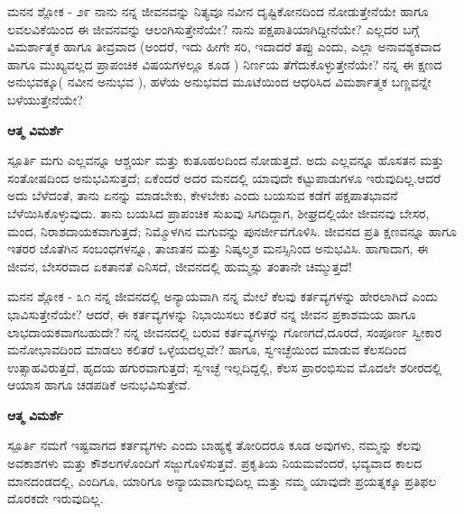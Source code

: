 \begin{mananam}{\mananamfont ಮನನ ಶ್ಲೋಕ - ೨೯}
\footnotesize \mananamtext ನಾನು ನನ್ನ ಜೀವನವನ್ನು ನಿತ್ಯವೂ ನವೀನ ದೃಷ್ಟಿಕೋನದಿಂದ ನೋಡುತ್ತೇನೆಯೇ ಹಾಗೂ ಲವಲವಿಕೆಯಿಂದ ಈ ಜೀವನವನ್ನು ಆಲಂಗಿಸುತ್ತೇನೆಯೇ? ನಾನು ಪಕ್ಷಪಾತಿಯಾಗಿದ್ದೀನೆಯೇ? ಎಲ್ಲದರ ಬಗ್ಗೆ ವಿಮರ್ಶಾತ್ಮಕ ಹಾಗೂ ತೀವ್ರವಾದ (ಅಂದರೆ, ಇದು ಹೀಗೇ ಸರಿ, ಇದಾದರೆ ತಪ್ಪು ಎಂದು, ಎಲ್ಲಾ ಅನಾವಶ್ಯಕವಾದ ಹಾಗೂ ಮುಖ್ಯವಲ್ಲದ ಪ್ರಾಪಂಚಿಕ ವಿಷಯಗಳಲ್ಲೂ ಕೂಡ ) ನಿರ್ಣಯ ತೆಗೆದುಕೊಳ್ಳುತ್ತೇನೆಯೇ? ನನ್ನ ಈ ಕ್ಷಣದ ಅನುಭವಕ್ಕೂ( ನವೀನ ಅನುಭವ ), ಹಳೆಯ  ಅನುಭವದ ಮೂಟೆಯಿಂದ ಆಧರಿಸಿದ ವಿಮರ್ಶಾತ್ಮಕ ಬಣ್ಣವನ್ನೇ ಬಳೆಯುತ್ತೇನೆಯೇ?
\end{mananam}
\WritingHand\enspace\textbf{ಆತ್ಮ ವಿಮರ್ಶೆ}
\begin{inspiration}{\mananamfont ಸ್ಪೂರ್ತಿ}
\footnotesize \mananamtext ಮಗು ಎಲ್ಲವನ್ನೂ ಆಶ್ಚರ್ಯ ಮತ್ತು ಕುತೂಹಲದಿಂದ ನೋಡುತ್ತದೆ. ಅದು ಎಲ್ಲವನ್ನೂ ಹೊಸತನ ಮತ್ತು ಸಂತೋಷದಿಂದ ಅನುಭವಿಸುತ್ತದೆ; ಏಕೆಂದರೆ ಅದರ ಮನದಲ್ಲಿ ಯಾವುದೇ ಕಟ್ಟುಪಾಡುಗಳೂ ಇರುವುದಿಲ್ಲ.ಆದರೆ ಅದು ಬೆಳೆದಂತೆ, ತಾನು ಏನನ್ನು ಮಾಡಬೇಕು, ಕೇಳಬೇಕು ಎಂದು ಬಯಸುವ ಕಡೆಗೆ ಪಕ್ಷಪಾತಭಾವನೆ ಬೆಳೆಯಿಸಿಕೊಳ್ಳುವುದು. ತಾನು ಬಯಸಿದ ಪ್ರಾಪಂಚಿಕ ಸುಖವು ಸಿಗದಿದ್ದಾಗ,  ಶೀಘ್ರದಲ್ಲಿಯೇ ಜೀವನವು ಬೇಸರ, ಮಂದ, ನಿರಾಶದಾಯಕವಾಗುತ್ತದೆ; ನಿಮ್ಮೊಳಗಿನ ಮಗುವನ್ನು ಪುನರ್ಜೀವಗೊಳಿಸಿ. ಜೀವನದ ಪ್ರತಿ ಕ್ಷಣವನ್ನೂ ಹಾಗೂ ಇತರರ ಜೊತೆಗಿನ ಸಂಬಂಧಗಳನ್ನೂ, ತಾಜಾತನ ಮತ್ತು ನಿಷ್ಕಲ್ಮಶ ಮನಸ್ಸಿನಿಂದ ಅನುಭವಿಸಿ. ಹಾಗಾದಾಗ, ಈ ಜೀವನ, ಬೇಸರವಾದ ಏಕತಾನತೆ ಎನಿಸದೆ, ಜೀವನದಲ್ಲಿ ಹುಮ್ಮಸ್ಸು ತಂತಾನೇ ಚಿಮ್ಮುತ್ತದೆ!
\end{inspiration}
\newpage

\begin{mananam}{\mananamfont ಮನನ ಶ್ಲೋಕ - ೩೧}
\footnotesize \mananamtext ನನ್ನ ಜೀವನದಲ್ಲಿ ಅನ್ಯಾಯವಾಗಿ ನನ್ನ ಮೇಲೆ ಕೆಲವು ಕರ್ತವ್ಯಗಳನ್ನು ಹೇರಲಾಗಿದೆ ಎಂದು ಭಾವಿಸುತ್ತೇನೆಯೇ? ಆದರೆ, ಈ ಕರ್ತವ್ಯಗಳನ್ನು ನಿಭಾಯಿಸಲು ಕಲಿತರೆ ನನ್ನ ಜೀವನ ಪ್ರಕಾಶಮಯ ಹಾಗೂ ಲಾಭದಾಯಕವಾಗಬಹುದೇ? ನನ್ನ ಜೀವನದಲ್ಲಿ ಬರುವ ಕರ್ತವ್ಯಗಳನ್ನು ಗೊಣಗದೆ,ದೂರದೆ, ಸಂಪೂರ್ಣ ಸ್ವೀಕಾರ ಮನೋಭಾವದಿಂದ ಮಾಡಲು ಕಲಿತರೆ ಒಳ್ಳೆಯದಲ್ಲವೇ? ಹಾಗೂ, ಸ್ವಇಚ್ಛೆಯಿಂದ ಮಾಡುವ ಕೆಲಸದಿಂದ ಉತ್ಸಾಹವಿರುತ್ತದೆ, ಹೃದಯ ಹಗುರವಾಗುತ್ತದೆ; ಸ್ವಇಚ್ಛೆ ಇಲ್ಲದಿದ್ದಲ್ಲಿ, ಕೆಲಸ ಪ್ರಾರಂಭಿಸುವ  ಮೊದಲೇ ಶರೀರದಲ್ಲಿ ಆಯಾಸ ಹಾಗೂ ಚಡಪಡಿಕೆ ಅನುಭವಿಸುತ್ತೇವೆ. 
\end{mananam}
\WritingHand\enspace\textbf{ಆತ್ಮ ವಿಮರ್ಶೆ}
\begin{inspiration}{\mananamfont ಸ್ಪೂರ್ತಿ}
\footnotesize \mananamtext ನಮಗೆ ಇಷ್ಟವಾಗದ ಕರ್ತವ್ಯಗಳು ಎಂದು ಬಾಹ್ಯಕ್ಕೆ ತೋರಿದರೂ ಕೂಡ ಅವುಗಳು,  ನಮ್ಮನ್ನು ಕೆಲವು ಅವಕಾಶಗಳು ಮತ್ತು ಕೌಶಲಗಳೊಂದಿಗೆ ಸಜ್ಜುಗೊಳಿಸುತ್ತವೆ. ಪ್ರಕೃತಿಯ ನಿಯಮವೆಂದರೆ, ಭವ್ಯವಾದ ಕಾಲದ ಮಾನದಂಡದಲ್ಲಿ,  ಎಂದಿಗೂ, ಯಾರಿಗೂ ಅನ್ಯಾಯವಾಗುವುದಿಲ್ಲ ಮತ್ತು ನಮ್ಮ ಯಾವುದೇ ಪ್ರಯತ್ನಕ್ಕೂ ಪ್ರತಿಫಲ ದೊರಕದೇ ಇರುವುದಿಲ್ಲ.
\end{inspiration}
\newpage

